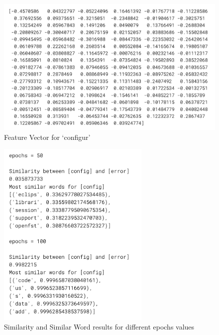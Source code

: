 \documentclass[english,bachelor]{swsLeipzig}
\begin{document}
\begin{figure}[h]
  \includegraphics[width=1\textwidth]{images/featvector.png}
  \caption{Feature Vector for `configur'}
  \label{fig:figure51}
\end{figure}

\begin{figure}[h]
  \centering
  \includegraphics[width=0.65\textwidth]{images/epochres.png}
  \caption{Similarity and Similar Word results for different epochs values}
  \label{fig:figure54}
\end{figure}
\end{document}
